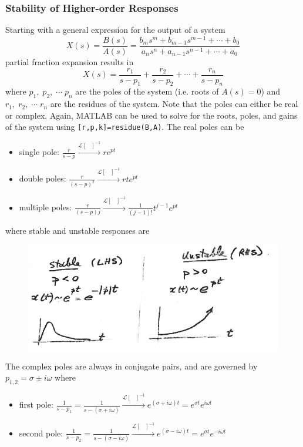 \documentclass[12pt,letter]{article}
\numberwithin{ex}{section} %
\numberwithin{re}{section} %
\newcommand{\Laplace}[1]{\ensuremath{\mathcal{L}{\left[#1\right]}}}
\numberwithin{equation}{section}	%
\begin{document}
%


\subsubsection{Stability of Higher-order Responses}

Starting with a general expression for the output of a system
\begin{equation}
X(s) = \frac{B(s)}{A(s)} = \frac{b_ms^m+b_{m-1}s^{m-1} + \cdots + b_0}{a_ns^n+a_{n-1}s^{n-1} + \cdots + a_0}
\end{equation}
partial fraction expansion results in
\begin{equation}
X(s) = \frac{r_1}{s-p_1} + \frac{r_2}{s-p_2} + \cdots + \frac{r_n}{s-p_n}
\end{equation}
where $p_1, \; p_2, \; \cdots \; p_n$ are the poles of the system (i.e. roots of $A(s)=0$) and $r_1,\; r_2,\; \cdots \; r_n$ are the residues of the system. Note that the poles can either be real or complex. Again, MATLAB can be used to solve for the roots, poles, and gains of the system using \texttt{[r,p,k]=residue(B,A)}. The real poles can be
\begin{itemize}
	\item single pole: $\frac{r}{s-p} \xrightarrow{\Laplace{\; \; \;}^{-1}} re^{pt}$
	\item double poles: $\frac{r}{(s-p)^2} \xrightarrow{\Laplace{\; \; \;}^{-1}} rte^{pt}$
	\item multiple poles: $\frac{r}{(s-p)j} \xrightarrow{\Laplace{\; \; \;}^{-1}} \frac{1}{(j-1)!}t^{j-1}e^{pt}$
\end{itemize} 
where stable and unstable responses are
\begin{figure}[H]
	\centering
	\includegraphics[width=4.5in]{../figures/stability_higher_order_systems_real_poles}
\end{figure}
The complex poles are always in conjugate pairs, and are governed by $p_{1,2}=\sigma \pm i \omega$ where
\begin{itemize}
	\item first pole: $\frac{1}{s-p_1} = \frac{1}{s-(\sigma + i \omega)} \xrightarrow{\Laplace{\; \; \;}^{-1}} e^{(\sigma + i \omega)t} = e^{\sigma t} e^{i \omega t}$
	\item second pole: $\frac{1}{s-p_2} = \frac{1}{s-(\sigma - i \omega)} \xrightarrow{\Laplace{\; \; \;}^{-1}} e^{(\sigma - i \omega)t} = e^{\sigma t} e^{-i \omega t}$
\end{itemize} 
\end{document}
